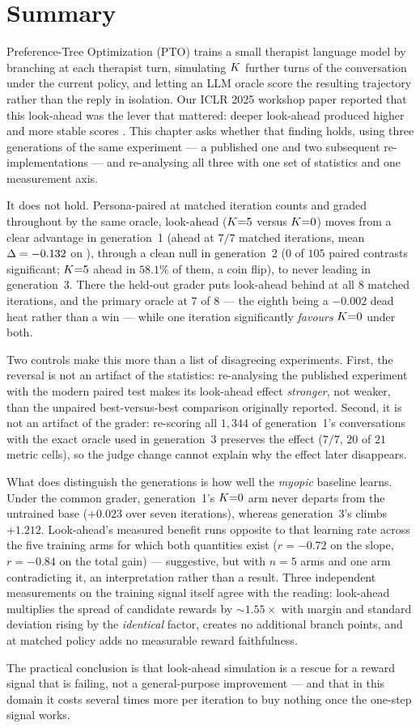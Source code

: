 \section*{Summary}

Preference-Tree Optimization (PTO) trains a small therapist language model by branching at
each therapist turn, simulating $K$ further turns of the conversation under the current
policy, and letting an LLM oracle score the resulting trajectory rather than the reply in
isolation. Our ICLR 2025 workshop paper reported that this look-ahead was the lever that
mattered: deeper look-ahead produced higher and more stable scores
\citep{baruch2025pto}. This chapter asks whether that finding holds, using three
generations of the same experiment --- a published one and two subsequent
re-implementations --- and re-analysing all three with one set of statistics and one
measurement axis.

It does not hold. Persona-paired at matched iteration counts and graded throughout by the
same \primaryjudge{} oracle, look-ahead ($K{=}5$ versus $K{=}0$) moves from a clear
advantage in generation~1 (ahead at $7/7$ matched iterations, mean $\Delta = -0.132$ on
\QQ{}), through a clean null in generation~2 ($0$ of $105$ paired contrasts significant;
$K{=}5$ ahead in $58.1\%$ of them, a coin flip), to never leading in generation~3. There
the held-out grader puts look-ahead behind at all $8$ matched iterations, and the primary
oracle at $7$ of $8$ --- the eighth being a $-0.002$ dead heat rather than a win --- while
one iteration significantly \emph{favours} $K{=}0$ under both.

Two controls make this more than a list of disagreeing experiments. First, the reversal is
not an artifact of the statistics: re-analysing the published experiment with the modern
paired test makes its look-ahead effect \emph{stronger}, not weaker, than the unpaired
best-versus-best comparison originally reported. Second, it is not an artifact of the
grader: re-scoring all $1{,}344$ of generation~1's conversations with the exact oracle used
in generation~3 preserves the effect ($7/7$, $20$ of $21$ metric cells), so the judge
change cannot explain why the effect later disappears.

What does distinguish the generations is how well the \emph{myopic} baseline learns. Under
the common grader, generation~1's $K{=}0$ arm never departs from the untrained base
($+0.023$ over seven iterations), whereas generation~3's climbs $+1.212$. Look-ahead's
measured benefit runs opposite to that learning rate across the five training arms for
which both quantities exist ($r = -0.72$ on the slope, $r = -0.84$ on the total gain) ---
suggestive, but with $n = 5$ arms and one arm contradicting it, an interpretation rather
than a result. Three independent measurements on the training signal itself agree with the
reading: look-ahead multiplies the spread of candidate rewards by ${\sim}1.55\times$ with
margin and standard deviation rising by the \emph{identical} factor, creates no additional
branch points, and at matched policy adds no measurable reward faithfulness.

The practical conclusion is that look-ahead simulation is a rescue for a reward signal that
is failing, not a general-purpose improvement --- and that in this domain it costs several
times more per iteration to buy nothing once the one-step signal works.
